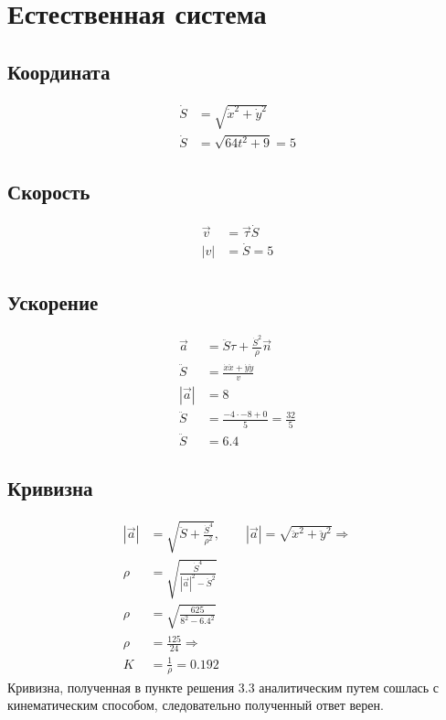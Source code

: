 \section{Естественная система}

\subsection{Координата}
\begin{align}
    \dot{S} &= \sqrt{\dot{x}^{2} + \dot{y}^{2}} \\
    \dot{S} &= \sqrt{64t^{2} + 9} = 5
\end{align}

\subsection{Скорость}
\begin{align}
    \vec{v} &= \vec{\tau}\dot{S} \\
    \left|v\right| &= \dot{S} = 5
\end{align}

\subsection{Ускорение}
\begin{align}
    \vec{a} &= \ddot{S}\tau + \frac{\dot{S}^{2}}{\rho}\vec{n} \\
    \ddot{S} &= \frac{\dot{x}\ddot{x} + \dot{y}\ddot{y}}{v} \\
    \left|\vec{a}\right| &= 8 \\
    \ddot{S} &= \frac{-4 \cdot -8 + 0}{5} = \frac{32}{5} \\
    \ddot{S} &= 6.4
\end{align}

\subsection{Кривизна}
\begin{align}
    \left|\vec{a}\right| &= \sqrt{\ddot{S} + \frac{\dot{S}^{4}}{\rho^{2}}}, \qquad
    \left|\vec{a}\right| = \sqrt{\ddot{x}^{2} + \ddot{y}^{2}} \Rightarrow \\
    \rho &= \sqrt{\frac{\dot{S}^{4}}{\left|\vec{a}\right|^{2} - \ddot{S}^{2}}} \\
    \rho &= \sqrt{\frac{625}{8^{2} - 6.4^{2}}} \\
    \rho &= \frac{125}{24} \Rightarrow \\
    K &= \frac{1}{\rho} = 0.192
\end{align}
Кривизна, полученная в пункте решения 3.3 аналитическим путем сошлась с кинематическим способом,
следовательно полученный ответ верен.

